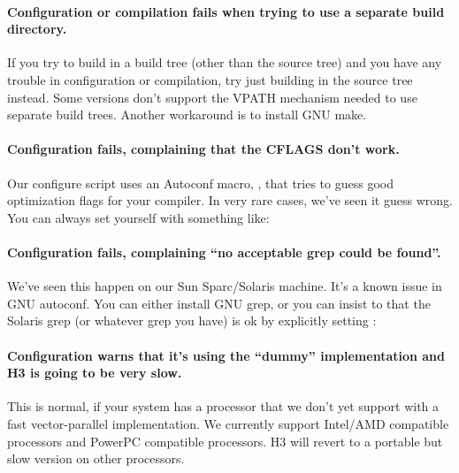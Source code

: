 \paragraph{Configuration or compilation fails when trying to use a
  separate build directory.}  If you try to build in a build tree
(other than the source tree) and you have any trouble in configuration
or compilation, try just building in the source tree instead. Some
 versions don't support the VPATH mechanism needed to use
separate build trees. Another workaround is to install GNU make.

\paragraph{Configuration fails, complaining that the CFLAGS don't
  work.} Our configure script uses an Autoconf macro,
  , that tries to guess good optimization flags
  for your compiler. In very rare cases, we've seen it guess wrong.
  You can always set  yourself with something like:


\paragraph{Configuration fails, complaining ``no acceptable grep could
  be found''.} We've seen this happen on our Sun Sparc/Solaris
machine. It's a known issue in GNU autoconf. You can either install
GNU grep, or you can insist to  that the Solaris
grep (or whatever grep you have) is ok by explicitly setting
:


\paragraph{Configuration warns that it's using the ``dummy''
implementation and H3 is going to be very slow.} This is normal, if
your system has a processor that we don't yet support with a fast
vector-parallel implementation. We currently support Intel/AMD
compatible processors and PowerPC compatible processors.  H3 will
revert to a portable but slow version on other processors.


